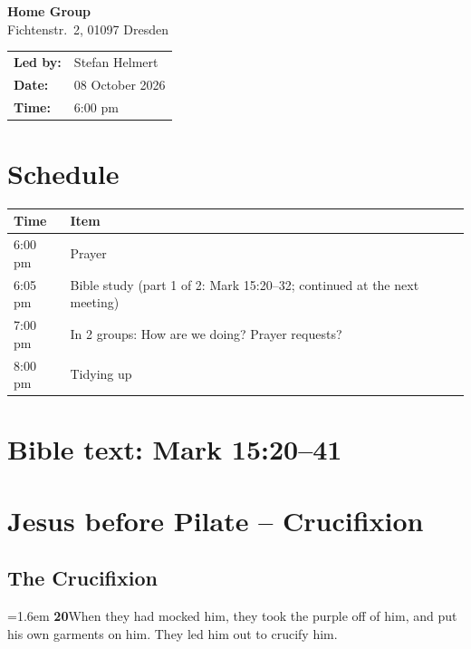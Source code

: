 \documentclass[12pt,a4paper]{article}
\newcommand{\vers}[2]{%
  \par\hangindent=1.6em\hangafter=1
  \textbf{#1}\enspace #2\par}
\begin{document}
\begin{center}
  {\LARGE\bfseries Home Group}\\[6pt]
  {\large Fichtenstr.~2, 01097 Dresden}\\[10pt]
  \begin{tabular}{ll}
    \textbf{Led by:} & Stefan Helmert \\
    \textbf{Date:}   & 08 October 2026 \\
    \textbf{Time:}   & 6:00 pm \\
  \end{tabular}
\end{center}

\vspace{1em}

\section*{Schedule}

\begin{tabularx}{\textwidth}{@{}lX@{}}
  \toprule
  \textbf{Time} & \textbf{Item} \\
  \midrule
  6:00 pm & Prayer \\
  6:05 pm & Bible study (part 1 of 2: Mark 15:20--32; continued at the next meeting) \\
  7:00 pm & In 2 groups: How are we doing? Prayer requests? \\
  8:00 pm & Tidying up \\
  \bottomrule
\end{tabularx}

\vspace{1.5em}

\section*{Bible text: Mark 15:20--41}

\section*{Jesus before Pilate -- Crucifixion}

\subsection*{The Crucifixion}

\vers{20}{When they had mocked him, they took the purple off of him, and put his own garments on him. They led him out to crucify him.}
\end{document}
